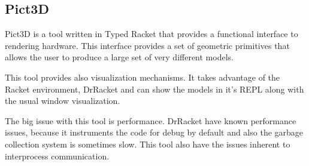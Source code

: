 
\subsection{Pict3D} %
\label{sub:pict3d}

Pict3D is a tool written in Typed Racket that provides a functional interface to rendering hardware. This interface provides a set of geometric primitives that allows the user to produce a large set of very different models.

This tool provides also visualization mechanisms. It takes advantage of the Racket environment, DrRacket and can show the models in it's REPL along with the usual window visualization.

The big issue with this tool is performance. DrRacket have known performance issues, because it instruments the code for debug by default and also the garbage collection system is sometimes slow. This tool also have the issues inherent to interprocess communication.



